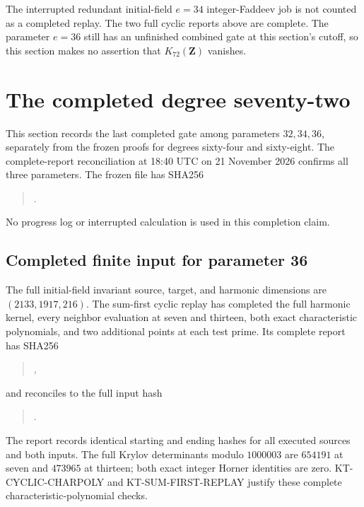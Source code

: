 \documentclass[11pt,a4paper]{article}
\theoremstyle{definition}
\begin{document}
The interrupted redundant initial-field $e=34$
integer-Faddeev job is not counted as a completed replay.
The two full cyclic reports above are complete.  The
parameter $e=36$ still has an unfinished combined gate at
this section's cutoff, so this section makes no assertion
that $K_{72}(\mathbf Z)$ vanishes.



\section{The completed degree seventy-two}
\label{sec:kt-last-vanishing}

This section records the last completed gate among parameters
$32,34,36$, separately from the frozen proofs for degrees
sixty-four and sixty-eight.  The complete-report reconciliation
at 18:40 UTC on 21 November 2026 confirms all three parameters.
The frozen file 
has SHA256
\begin{quote}\small
{}.
\end{quote}
No progress log or interrupted calculation is used in this
completion claim.

\subsection{Completed finite input for parameter 36}

The full initial-field invariant source, target, and harmonic
dimensions are $(2133,1917,216)$.  The sum-first cyclic replay
has completed the full harmonic kernel, every neighbor
evaluation at seven and thirteen, both exact characteristic
polynomials, and two additional points at each test prime.
Its complete report has SHA256
\begin{quote}\small
{},
\end{quote}
and reconciles to the full input hash
\begin{quote}\small
{}.
\end{quote}
The report records identical starting and ending hashes for
all executed sources and both inputs.  The full Krylov
determinants modulo $1000003$ are $654191$ at seven and
$473965$ at thirteen; both exact integer Horner identities
are zero.  KT-CYCLIC-CHARPOLY and KT-SUM-FIRST-REPLAY
justify these complete characteristic-polynomial checks.
\end{document}
